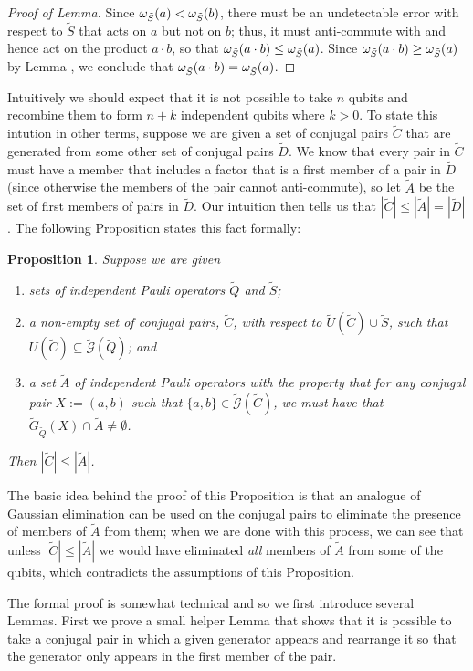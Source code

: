 \documentclass[twocolumn,showpacs,preprintnumbers,amsmath,amssymb,nofootinbib,pra,floatfix]{revtex4-1}
\newtheorem{proposition}{Proposition}
\newenvironment{remark}[1][Remark]{\begin{trivlist}
\item[\hskip \labelsep {\bfseries #1}]}{\end{trivlist}}
\newcommand{\set}{\tilde}
\newcommand{\genfun}{\tilde{\mathcal{G}}}
\begin{document}
\begin{proof}[Proof of Lemma]
Since $\om_{\set S}(a)<\om_{\set S}(b)$, there must be an undetectable error with respect to $\set S$ that acts on $a$ but not on $b$;  thus, it must anti-commute with and hence act on the product $a\cdot b$, so that $\om_{\set S}(a\cdot b)\le \om_{\set S}(a)$.  Since $\om_{\set S}(a\cdot b)\ge \om_{\set S}(a)$ by Lemma , we conclude that $\om_{\set S}(a\cdot b) = \om_{\set S}(a)$.
\end{proof}
\begin{remark}
Intuitively we should expect that it is not possible to take $n$ qubits and recombine them to form $n+k$ independent qubits where $k>0$.  To state this intution in other terms, suppose we are given a set of conjugal pairs $\set C$ that are generated from some other set of conjugal pairs $\set D$.  We know that every pair in $\set C$ must have a member that includes a factor that is a first member of a pair in $\set D$ (since otherwise the members of the pair cannot anti-commute), so let $\set A$ be the set of first members of pairs in $\set D$.  Our intuition then tells us that $|\set C|\le |\set A|=|\set D|$.  The following Proposition states this fact formally:
\end{remark}
\begin{proposition}
\label{bound-on-recombinations}
Suppose we are given
\begin{enumerate}
\item sets of independent Pauli operators $\set Q$ and $\set S$;
\item a non-empty set of conjugal pairs, $\set C$, with respect to $\set U(\set C) \cup \set S$, such that $U(\set C)\subseteq \genfun(\set Q)$; and
\item a set $\set A$ of independent Pauli operators with the property that for any conjugal pair $X:=(a,b)$ such that $\{a,b\}\in\genfun(\set C)$, we must have that $\set G_{\set Q}(X) \cap \set A \ne \emptyset$.
\end{enumerate}
Then $|\set C|\le|\set A|$.
\end{proposition}
\begin{remark}
The basic idea behind the proof of this Proposition is that an analogue of Gaussian elimination can be used on the conjugal pairs to eliminate the presence of members of $\set A$ from them;  when we are done with this process, we can see that unless $|\set C|\le |\set A|$ we would have eliminated \emph{all} members of $\set A$ from some of the qubits, which contradicts the assumptions of this Proposition.

The formal proof is somewhat technical and so we first introduce several Lemmas.  First we prove a small helper Lemma that shows that it is possible to take a conjugal pair in which a given generator appears and rearrange it so that the generator only appears in the first member of the pair.
\end{remark}
\end{document}
